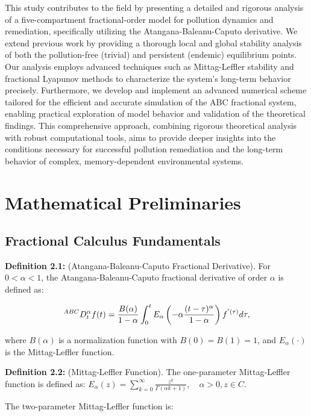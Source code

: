 \documentclass[10pt]{NSP1}
\newcommand{\fitwidth}[1]{\resizebox{\ifdim\width>\linewidth\linewidth\else\width\fi}{!}{#1}}
\begin{document}
This study contributes to the field by presenting a detailed and rigorous analysis of a five-compartment fractional-order model for pollution dynamics and remediation, specifically utilizing the Atangana-Baleanu-Caputo derivative. We extend previous work by providing a thorough local and global stability analysis of both the pollution-free (trivial) and persistent (endemic) equilibrium points. Our analysis employs advanced techniques such as Mittag-Leffler stability and fractional Lyapunov methods to characterize the system's long-term behavior precisely. Furthermore, we develop and implement an advanced numerical scheme tailored for the efficient and accurate simulation of the ABC fractional system, enabling practical exploration of model behavior and validation of the theoretical findings. This comprehensive approach, combining rigorous theoretical analysis with robust computational tools, aims to provide deeper insights into the conditions necessary for successful pollution remediation and the long-term behavior of complex, memory-dependent environmental systems.

\section{Mathematical Preliminaries}

\subsection{Fractional Calculus Fundamentals}

\textbf{Definition 2.1:} (Atangana-Baleanu-Caputo Fractional Derivative). \cite{ref1} For \(0 < \alpha < 1\), the Atangana-Baleanu-Caputo fractional derivative of order \(\alpha\) is defined as:

\[
\fitwidth{$\displaystyle ^{ABC}D_{t}^{\alpha}f(t) = \frac{B(\alpha)}{1 - \alpha}\int_{0}^{t}{}E_{\alpha}\left( - \alpha\frac{(t - \tau)^{\alpha}}{1 - \alpha} \right)f^{'(\tau)}d\tau,$}
\]

where \(B(\alpha)\) is a normalization function with \(B(0) = B(1) = 1\), and \(E_{\alpha}( \cdot )\) is the Mittag-Leffler function.

\textbf{Definition 2.2:} (Mittag-Leffler Function).\cite{ref7} The one-parameter Mittag-Leffler function is defined as: \(E_{\alpha}(z) = \sum_{k = 0}^{\infty}{}\frac{z^{k}}{\Gamma(\alpha k + 1)},\quad\alpha > 0,z \in C\).

The two-parameter Mittag-Leffler function is:
\end{document}
